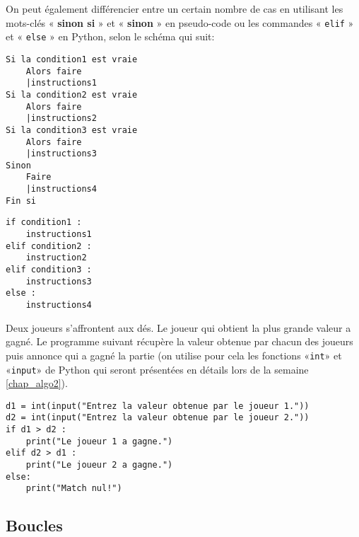 On peut également différencier entre un certain nombre de cas en utilisant les mots-clés « {\ttfamily\bf sinon si} » et « {\ttfamily\bf{sinon}} » en pseudo-code ou les commandes « \texttt{elif} » et « \texttt{else} » en Python, selon le schéma qui suit:
\begin{center}
	\begin{varwidth}[t]{.5\textwidth}
		\begin{lstlisting}[language=Pseudo,linewidth = 7cm]
Si la condition1 est vraie
    Alors faire
    |instructions1
Si la condition2 est vraie
    Alors faire
    |instructions2
Si la condition3 est vraie
    Alors faire
    |instructions3
Sinon
    Faire
    |instructions4
Fin si
\end{lstlisting}
	\end{varwidth}\hspace{1.5cm}
\begin{varwidth}[t]{.5\textwidth}
\begin{lstlisting}[language=iPython,linewidth = 5cm]
if condition1 :
    instructions1
elif condition2 :
    instruction2
elif condition3 :
    instructions3
else :
    instructions4
\end{lstlisting}
\end{varwidth}
\end{center}
\begin{example}
	Deux joueurs s'affrontent aux dés. Le joueur qui obtient la plus grande valeur a gagné. Le programme suivant récupère la valeur obtenue par chacun des joueurs puis annonce qui a gagné la partie (on utilise pour cela les fonctions «\texttt{int}» et «\texttt{input}» de Python qui seront présentées en détails lors de la semaine \ref{chap_algo2}).
	\begin{lstlisting}[language=iPython]
d1 = int(input("Entrez la valeur obtenue par le joueur 1."))
d2 = int(input("Entrez la valeur obtenue par le joueur 2."))
if d1 > d2 :
    print("Le joueur 1 a gagne.")
elif d2 > d1 :
    print("Le joueur 2 a gagne.")
else:
    print("Match nul!")\end{lstlisting}
\end{example}


\subsection{Boucles}

